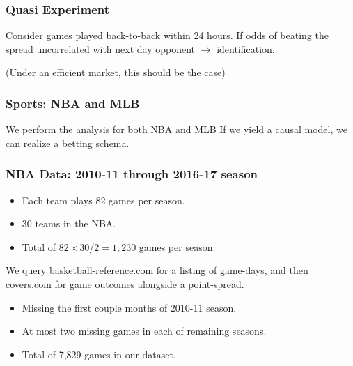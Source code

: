 \documentclass{beamer}
\begin{document}
\begin{frame}   \frametitle{Quasi Experiment}
  \begin{block}{Consider games played back-to-back within 24 hours.}     If odds of beating the spread uncorrelated with next day opponent 
    $\longrightarrow$ identification.

  (Under an efficient market, this should be the case)    \end{block}  
\end{frame}

\begin{frame}   \frametitle{Sports: NBA and MLB}
  \begin{block}{We perform the analysis for both NBA and MLB}     If we yield a causal model, we can realize a betting schema.   \end{block} \end{frame}

\begin{frame}   \frametitle{NBA Data: 2010-11 through 2016-17 season}
  \begin{itemize}     \item Each team plays 82 games per season.
    \item 30 teams in the NBA.
    \item Total of $82 \times 30 / 2 = 1,230$ games per season.  
  \end{itemize}

  We query \href{http://www.basketball-reference.com/leagues/}{basketball-reference.com}
  for a listing of game-days, and then 
  \href{http://www.covers.com/sports/NBA/matchups?selectedDate=2011-1-01}{covers.com} for 
  game outcomes alongside a point-spread.

  \begin{itemize}     \item Missing the first couple months of 2010-11 season.
    \item At most two missing games in each of remaining seasons.
    \item Total of 7,829 games in our dataset.   \end{itemize}
\end{frame}
\end{document}
